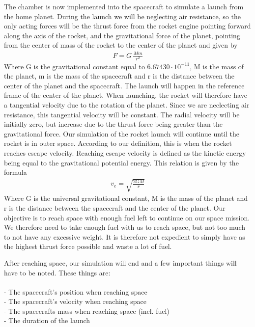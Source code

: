 \documentclass[reprint,english,notitlepage]{revtex4-2}
\begin{document}
The chamber is now implemented into the spacecraft to simulate a launch from the home planet.
During the launch we will be neglecting air resistance, so the only acting forces will be the thrust force from the rocket engine pointing forward along the axis of the rocket, and the gravitational force of the planet, pointing from the center of mass of the rocket to the center of the planet and given by
\begin{align*}
    F = G\,\frac{Mm}{r^2}
\end{align*}
Where G is the gravitational constant equal to $6.67430 \cdot 10^{-11}$, M is the mass of the planet, m is the mass of the spacecraft and r is the distance between the center of the planet and the spacecraft.
The launch will happen in the reference frame of the center of the planet.
When launching, the rocket will therefore have a tangential velocity due to the rotation of the planet. Since we are neclecting air resistance, this tangential velocity will be constant.
The radial velocity will be initially zero, but increase due to the thrust force being greater than the gravitational force.
Our simulation of the rocket launch will continue until the rocket is in outer space. According to our definition, this is when the rocket reaches escape velocity.
Reaching escape velocity is defined as the kinetic energy being equal to the gravitational potential energy. This relation is given by the formula
\begin{align*}
    v_e = \sqrt{\frac{2GM}{r}}
\end{align*}
Where G is the universal gravitational constant, M is the mass of the planet and r is the distance between the spacecraft and the center of the planet.
Our objective is to reach space with enough fuel left to continue on our space mission.
We therefore need to take enough fuel with us to reach space, but not too much to not have any excessive weight.
It is therefore not expedient to simply have as the highest thrust force possible and waste a lot of fuel.

After reaching space, our simulation will end and a few important things will have to be noted. These things are:\\\\
- The spacecraft's position when reaching space\\
- The spacecraft's velocity when reaching space\\
- The spacecrafts mass when reaching space (incl. fuel)\\
- The duration of the launch\\
\end{document}
